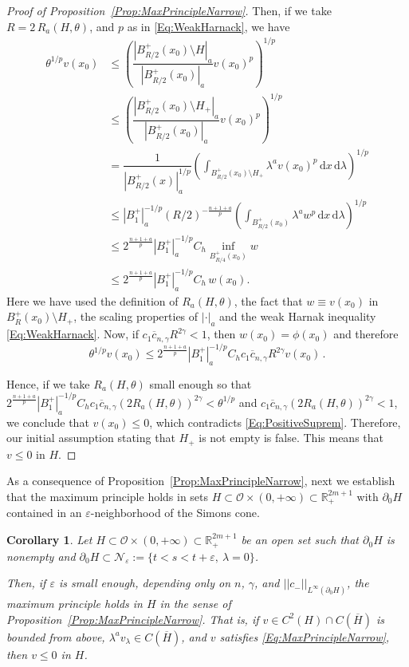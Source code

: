 \documentclass[12pt,reqno]{amsart}
\newtheorem{corollary}[theorem]{Corollary}
\theoremstyle{definition}
\theoremstyle{remark}
\newcommand{\con}[1]{\mathbb{#1}}
\newcommand{\R}{\con{R}} %
\newcommand{\ncal}{\mathcal{N}}
\newcommand{\ocal}{\mathcal{O}}
\newcommand{\norm}[1]{\left | \left |{#1} \right | \right |}
\newcommand{\s}{\gamma}
\renewcommand{\d}{\,\mathrm{d}} %
\numberwithin{equation}{section}
\begin{document}
\begin{proof}[Proof of Proposition~\ref{Prop:MaxPrincipleNarrow}]
Then, if we take $R = 2\,R_a( H,\theta)$, and $p$ as in \eqref{Eq:WeakHarnack}, we have
\begin{align*}
\theta^{1/p} v(x_0) & \leq \left (  \dfrac{|B^+_{R/2}(x_0)\setminus   H|_a}{|B^+_{R/2}(x_0)|_a}  v(x_0)^p \right)^{1/p} \\
& \leq \left (  \dfrac{|B^+_{R/2}(x_0)\setminus  H_+|_a}{|B^+_{R/2}(x_0)|_a}  v(x_0)^p \right)^{1/p} \\
&= \dfrac{1}{|B^+_{R/2}(x)|_a^{1/p}}  \left (  \int_{B^+_{R/2}(x_0)\setminus  H_+} \lambda ^a v(x_0)^p \d x \d \lambda  \right)^{1/p} \\
&\leq |B_1^+|_a^{-1/p} (R/2)^{- \frac{n+1+a}{p}} \left (  \int_{B^+_{R/2}(x_0)} \lambda ^a w^p \d x \d \lambda  \right)^{1/p} \\
&\leq 2^{\frac{n+1+a}{p}}|B_1^+|_a^{-1/p} C_h \inf_{B^+_{R/4}(x_0)} w \\
& \leq 2^{\frac{n+1+a}{p}}|B_1^+|_a^{-1/p} C_h \,  w(x_0).
\end{align*}
Here we have used the definition of $R_a( H,\theta)$, the fact that $w \equiv v(x_0)$ in $B^+_R(x_0)\setminus H_+$, the scaling properties of $|\cdot |_a$ and the weak Harnak inequality \eqref{Eq:WeakHarnack}. Now, if $c_1 \overline{c}_{n,\s} R^{2\s} < 1$, then $w(x_0) = \phi(x_0)$ and therefore
$$
\theta^{1/p} v(x_0) \leq  2^{\frac{n+1+a}{p}}|B_1^+|_a^{-1/p} C_h c_1 \overline{c}_{n,\s} R^{2\s} v(x_0)\,.
$$

Hence, if we take $R_a( H,\theta)$ small enough so that $ 2^{\frac{n+1+a}{p}} |B_1^+|_a^{-1/p} C_h c_1 \overline{c}_{n,\s} (2 R_a( H,\theta))^{2\s} < \theta^{1/p}$ and $c_1 \overline{c}_{n,\s} (2 R_a( H,\theta))^{2\s} < 1$, we conclude that $v(x_0) \leq 0$, which contradicts \eqref{Eq:PositiveSuprem}. Therefore, our initial assumption stating that $ H_+$ is not empty is false. This means that $v\leq 0$ in $H$.
\end{proof}

As a consequence of Proposition~\ref{Prop:MaxPrincipleNarrow}, next we establish that the maximum principle holds in sets $ H \subset \ocal \times (0, +\infty) \subset \R^{2m+1}_+$ with $\partial_0  H$ contained in an $\varepsilon$-neighborhood of the Simons cone.

\begin{corollary}
\label{Cor:MaxPrincipleNarrowSaddle}
Let $H\subset \ocal \times (0, +\infty) \subset \R^{2m + 1}_+$ be an open set such that $\partial_0 H$ is nonempty and $\partial_0 H \subset \ncal_\varepsilon := \{t < s < t+\varepsilon, \ \lambda= 0 \}$. 

Then, if $\varepsilon$ is small enough, depending only on $n$, $\s$, and $\norm{c_-}_{L^\infty(\partial_0 H)}$, the maximum principle holds in $H$ in the sense of Proposition~\ref{Prop:MaxPrincipleNarrow}. That is, if $v \in C^2 (H)\cap C(\overline{H})$ is bounded from above, $\lambda^a v_\lambda \in C (\overline{H})$, and $v$ satisfies \eqref{Eq:MaxPrincipleNarrow}, then $v\leq 0$ in $H$.
\end{corollary}
\end{document}
